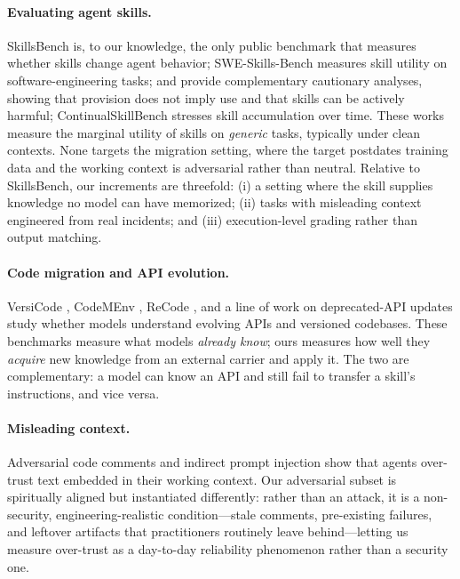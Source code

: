 \documentclass[11pt]{article}
\begin{document}
\paragraph{Evaluating agent skills.}
SkillsBench \citep{skillsbench} is, to our knowledge, the only public benchmark that measures whether skills change agent behavior; SWE-Skills-Bench \citep{swe-skills-bench} measures skill utility on software-engineering tasks; \citet{skilluse} and \citet{skillsharmful} provide complementary cautionary analyses, showing that provision does not imply use and that skills can be actively harmful; ContinualSkillBench \citep{continual-skill-bench} stresses skill accumulation over time.
These works measure the marginal utility of skills on \emph{generic} tasks, typically under clean contexts.
None targets the migration setting, where the target postdates training data and the working context is adversarial rather than neutral.
Relative to SkillsBench, our increments are threefold: (i) a setting where the skill supplies knowledge no model can have memorized; (ii) tasks with misleading context engineered from real incidents; and (iii) execution-level grading rather than output matching.

\paragraph{Code migration and API evolution.}
VersiCode \citep{versicode}, CodeMEnv \citep{codemenv}, ReCode \citep{recode}, and a line of work on deprecated-API updates \citep{deprecated-api} study whether models understand evolving APIs and versioned codebases.
These benchmarks measure what models \emph{already know}; ours measures how well they \emph{acquire} new knowledge from an external carrier and apply it.
The two are complementary: a model can know an API and still fail to transfer a skill's instructions, and vice versa.

\paragraph{Misleading context.}
Adversarial code comments \citep{adversarialcomments} and indirect prompt injection \citep{indirect-prompt-injection} show that agents over-trust text embedded in their working context.
Our adversarial subset is spiritually aligned but instantiated differently: rather than an attack, it is a non-security, engineering-realistic condition---stale comments, pre-existing failures, and leftover artifacts that practitioners routinely leave behind---letting us measure over-trust as a day-to-day reliability phenomenon rather than a security one.
\end{document}

